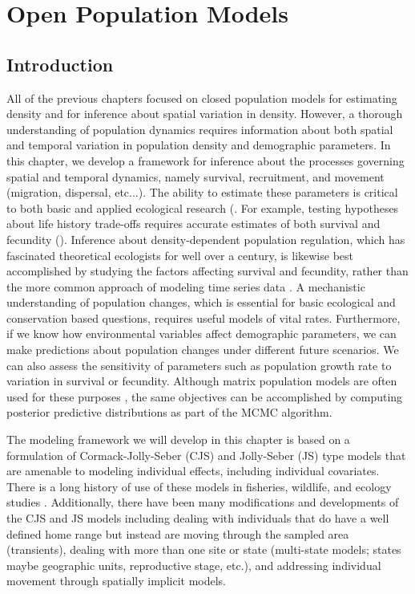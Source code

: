 \chapter{Open Population Models}
\label{chapt.open}


\vspace{0.3cm}


\section{Introduction}


All of the previous chapters focused on closed population models
for estimating density and for inference about spatial variation in density.
However, a thorough
understanding of population dynamics 
requires information about both
spatial and  temporal variation in population density and demographic parameters.
In this chapter,
we develop a framework for
inference about the processes governing spatial and temporal dynamics,
namely survival, recruitment, and movement (migration, dispersal, etc...).
The ability to estimate these parameters is critical to both basic and
applied ecological research (\cite{knape_deValpine:2012}. For example, testing hypotheses about
life history trade-offs requires accurate estimates of both survival
and fecundity (\cite{nichols_etal:1994}).
Inference about density-dependent population
regulation, which has fascinated theoretical ecologists for well over
a century,
is likewise best accomplished by studying
the factors affecting survival and fecundity, rather than the more common approach of
modeling time series data \citep{nichols_etal:2000}.  A mechanistic understanding 
of population changes, which is essential for basic ecological and conservation based questions,
requires useful models of vital
rates. Furthermore, if we know how environmental
variables affect demographic parameters, we can make predictions about
population changes under different future scenarios. We can also assess
the sensitivity of parameters such as population growth rate to
variation in survival or fecundity. Although matrix
population models are often used for these purposes \citep{caswell:1989,saether_bakke:2000}, the same
objectives can be accomplished by computing posterior predictive
distributions as part of the MCMC algorithm.

The modeling framework we will develop in this chapter is based on a
formulation of Cormack-Jolly-Seber (CJS) and Jolly-Seber (JS) type
models \citep{cormack:1964, jolly:1965, seber:1965} that are amenable
to modeling individual effects, including individual covariates.
There is a long history of use of these models in fisheries, wildlife,
and ecology studies \citep{pollock_etal:1990, lebreton_etal:1992,
  pradel:1996, williams_etal:2002, schwarz_arnason:2005, gimenez:2007}.
Additionally, there have been many modifications and developments of
the CJS and JS models including dealing with individuals that do have a 
well defined home range but instead are moving through the sampled area (transients), 
dealing with more than one site or state (multi-state models; states maybe 
geographic units, reproductive stage, etc.), and addressing individual
movement through spatially implicit models.



